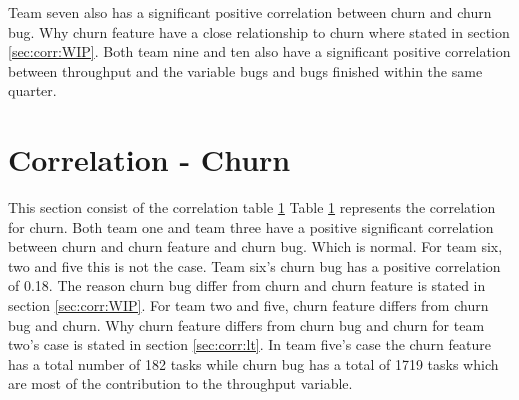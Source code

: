 \documentclass[UKenglish]{ifimaster}  %
\begin{document}
Team seven also has a significant positive correlation between churn and churn bug. Why churn feature have a close relationship to churn where stated in section \ref{sec:corr:WIP}. Both team nine and ten also have a significant positive correlation between throughput and the variable bugs and bugs finished within the same quarter.  


\section{Correlation - Churn}
\label{sec:corr:churn}

This section consist of the correlation table \ref{sec:corr:churn}
Table \ref{sec:corr:churn} represents the correlation for churn. Both team one and team three have a positive significant correlation between churn and churn feature and churn bug. Which is normal. For team six, two and five this is not the case. Team six's churn bug has a positive correlation of 0.18. The reason churn bug differ from churn and churn feature is stated in section \ref{sec:corr:WIP}. For team two and five, churn feature differs from churn bug and churn.  Why churn feature differs from churn bug and churn for team two's case is stated in section \ref{sec:corr:lt}. In team five's case the churn feature has a total number of 182 tasks while churn bug has a total of 1719 tasks which are most of the contribution to the throughput variable. 
\end{document}

